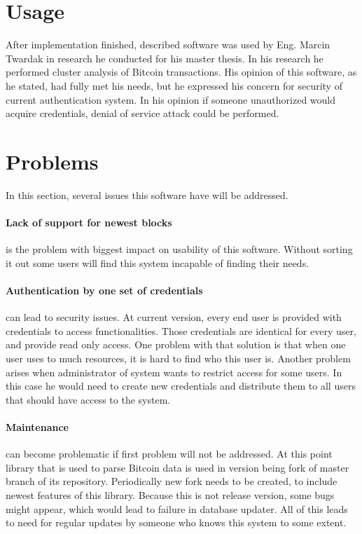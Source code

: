 \documentclass[12pt, en, eng, oneside]{mgr}
\begin{document}
\section{Usage}
After implementation finished, described software was used by Eng. Marcin Twardak in research he conducted for his master thesis. In his research he performed cluster analysis of Bitcoin transactions. His opinion of this software, as he stated, had fully met his needs, but he expressed his concern for security of current authentication system. In his opinion if someone unauthorized would acquire credentials, denial of service attack could be performed.

\section{Problems}
In this section, several issues this software have will be addressed.

\paragraph{Lack of support for newest blocks} is the problem with biggest impact on usability of this software. Without sorting it out some users will find this system incapable of finding their needs. 

\paragraph{Authentication by one set of credentials} can lead to security issues. At current version, every end user is provided with credentials to access functionalities. Those credentials are identical for every user, and provide read only access. One problem with that solution is that when one user uses to much resources, it is hard to find who this user is. Another problem arises when administrator of system wants to restrict access for some users. In this case he would need to create new credentials and distribute them to all users that should have access to the system.

\paragraph{Maintenance} can become problematic if first problem will not be addressed. At this point library that is used to parse Bitcoin data is used in version being fork of master branch of its repository. Periodically new fork needs to be created, to include newest features of this library. Because this is not release version, some bugs might appear, which would lead to failure in database updater. All of this leads to need for regular updates by someone who knows this system to some extent. 
\end{document}
